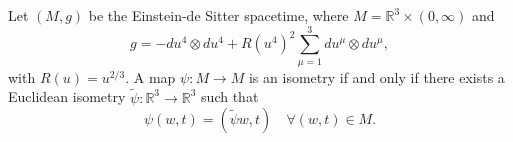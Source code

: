 Let $(M, g)$ be the Einstein-de Sitter spacetime, where $M = \mathbb{R}^3 \times (0, \infty)$ and
$$g = -du^4 \otimes du^4 + R(u^4)^2 \sum_{\mu=1}^3 du^\mu \otimes du^\mu,$$
with $R(u) = u^{2/3}$. A map $\psi: M \to M$ is an isometry if and only if there exists a Euclidean isometry $\tilde{\psi}: \mathbb{R}^3 \to \mathbb{R}^3$ such that
$$\psi(w, t) = (\tilde{\psi} w, t) \quad \forall (w, t) \in M.$$
